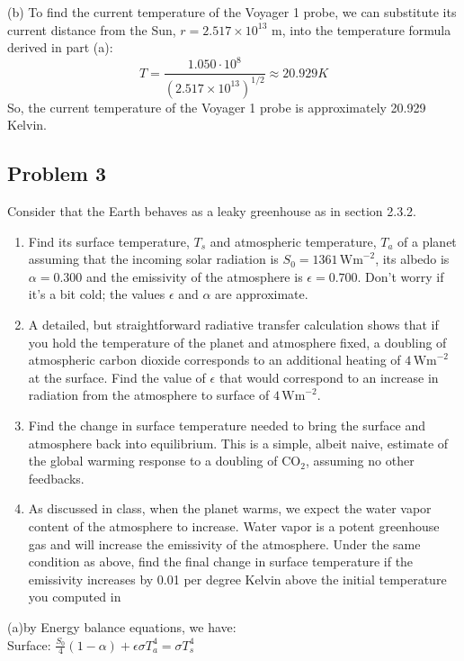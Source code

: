 \documentclass[letterpaper, 11pt]{article}
\newcommand{\1}{\mathds{1}}	%
\theoremstyle{definition}
\begin{document}
(b) To find the current temperature of the Voyager 1 probe, we can substitute its current distance from the Sun, $r = 2.517 \times 10^{13}$ m, into the temperature formula derived in part (a):
\[T = \frac{1.050 \cdot 10^8}{(2.517 \times 10^{13})^{1/2}} \approx 20.929 K\]
So, the current temperature of the Voyager 1 probe is approximately 20.929 Kelvin.
\subsection*{Problem 3}
Consider that the Earth behaves as a leaky greenhouse as in section 2.3.2.

\begin{enumerate}
\item[(a)] Find its surface temperature, $T_s$ and atmospheric temperature, $T_a$ of a planet assuming that the incoming solar radiation is $S_0 = 1361\,\text{Wm}^{-2}$, its albedo is $\alpha = 0.300$ and the emissivity of the atmosphere is $\epsilon = 0.700$. Don't worry if it's a bit cold; the values $\epsilon$ and $\alpha$ are approximate.

\item[(b)] A detailed, but straightforward radiative transfer calculation shows that if you hold the temperature of the planet and atmosphere fixed, a doubling of atmospheric carbon dioxide corresponds to an additional heating of $4\,\text{Wm}^{-2}$ at the surface. Find the value of $\epsilon$ that would correspond to an increase in radiation from the atmosphere to surface of $4\,\text{Wm}^{-2}$.

\item[(c)] Find the change in surface temperature needed to bring the surface and atmosphere back into equilibrium. This is a simple, albeit naive, estimate of the global warming response to a doubling of CO$_2$, assuming no other feedbacks.

\item[(d)] As discussed in class, when the planet warms, we expect the water vapor content of the atmosphere to increase. Water vapor is a potent greenhouse gas and will increase the emissivity of the atmosphere. Under the same condition as above, find the final change in surface temperature if the emissivity increases by 0.01 per degree Kelvin above the initial temperature you computed in

\end{enumerate}
(a)by Energy balance equations, we have: 
\\Surface: $\frac{S_0}{4}(1-\alpha) + \epsilon\sigma T_a^4 = \sigma T_s^4$
\end{document}
